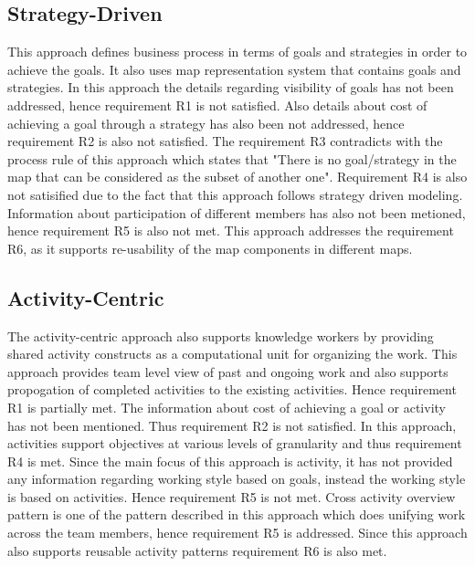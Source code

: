 \subsection{Strategy-Driven} 
This approach \cite{bider2005strategy} defines business process in terms of goals and strategies in order to achieve the goals. It also uses map representation system that contains goals and strategies. In this approach the details regarding visibility of goals has not been addressed, hence requirement R1 is not satisfied. Also details about cost of achieving a goal through a strategy has also been not addressed, hence requirement R2 is also not satisfied. The requirement R3 contradicts with the process rule of this approach which states that "There is no goal/strategy in the map that can be considered as the subset of another one". Requirement R4 is also not satisified due to the fact that this approach follows strategy driven modeling. Information about participation of different members has also not been metioned, hence requirement R5 is also not met. This approach addresses the requirement R6, as it supports re-usability of the map components in different maps. 

\subsection{Activity-Centric} 
The activity-centric approach \cite{Yarosh2009} also supports knowledge workers by providing shared activity constructs as a computational unit for organizing the work. This approach provides team level view of past and ongoing work and also supports propogation of completed activities to the existing activities. Hence requirement R1 is partially met. The information about cost of achieving a goal or activity has not been mentioned. Thus requirement R2 is not satisfied. In this approach, activities support objectives at various levels of granularity and thus requirement R4 is met. Since the main focus of this approach is activity, it has not provided any information regarding working style based on goals, instead the working style is based on activities. Hence requirement R5 is not met. Cross activity overview pattern is one of the pattern described in this approach which does unifying work across the team members, hence requirement R5 is addressed. Since this approach also supports reusable activity patterns requirement R6 is also met. 
 
